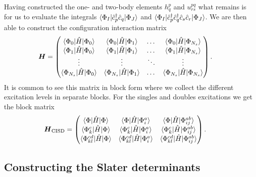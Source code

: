         Having constructed the one- and two-body elements $h^{p}_{q}$ and
        $u^{pq}_{rs}$ what remains is for us to evaluate the integrals
        $\langle \Phi_I |\hat{c}_{p}^{\dagger}\hat{c}_{q}| \Phi_J \rangle$ and
        $\langle \Phi_I |\hat{c}_{p}^{\dagger}\hat{c}_{q}^{\dagger}\hat{c}_{s}\hat{c}_{r}| \Phi_J \rangle$.
        We are then able to construct the configuration interaction matrix
        \begin{align}
            \boldsymbol{H}
            &=
            \begin{pmatrix}
                \langle \Phi_0 |\hat{H}| \Phi_0 \rangle &
                \langle \Phi_0 |\hat{H}| \Phi_1 \rangle &
                \dots &
                \langle \Phi_0 |\hat{H}| \Phi_{N_s} \rangle \\
                \langle \Phi_1 |\hat{H}| \Phi_0 \rangle &
                \langle \Phi_1 |\hat{H}| \Phi_1 \rangle &
                \dots &
                \langle \Phi_1 |\hat{H}| \Phi_{N_s} \rangle \\
                \vdots & \vdots & \ddots & \vdots \\
                \langle \Phi_{N_s} |\hat{H}| \Phi_0 \rangle &
                \langle \Phi_{N_s} |\hat{H}| \Phi_1 \rangle &
                \dots &
                \langle \Phi_{N_s} |\hat{H}| \Phi_{N_s} \rangle
            \end{pmatrix}.
        \end{align}
        It is common to see this matrix in block form where we collect
        the different excitation levels in separate blocks.
        For the singles and doubles excitations we get the block matrix
        \begin{align}
            \boldsymbol{H}_{\text{CISD}}
            &=
            \begin{pmatrix}
                \langle \Phi |\hat{H}| \Phi \rangle &
                \langle \Phi |\hat{H}| \Phi^{a}_{i} \rangle &
                \langle \Phi |\hat{H}| \Phi^{ab}_{ij} \rangle \\
                \langle \Phi^{c}_{k} |\hat{H}| \Phi \rangle &
                \langle \Phi^{c}_{k} |\hat{H}| \Phi^{a}_{i} \rangle &
                \langle \Phi^{c}_{k} |\hat{H}| \Phi^{ab}_{ij} \rangle \\
                \langle \Phi^{cd}_{kl} |\hat{H}| \Phi \rangle &
                \langle \Phi^{cd}_{kl} |\hat{H}| \Phi^{a}_{i} \rangle &
                \langle \Phi^{cd}_{kl} |\hat{H}| \Phi^{ab}_{ij} \rangle \\
            \end{pmatrix}.
        \end{align}

        \subsection{Constructing the Slater determinants}


